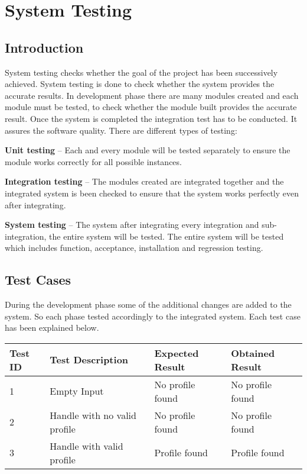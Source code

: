 \documentclass[12pt,a4paper]{report}
\begin{document}
\newpage
\chapter{System Testing}
\section{Introduction}
System testing checks whether the goal of the project has been successively achieved. System testing is done to check whether the system provides the accurate results. In development phase there are many modules created and each module must be tested, to check whether the module built provides the accurate result. Once the system is completed the integration test has to be conducted. It assures the software quality. There are different types of testing:

\textbf{Unit testing} – Each and every module will be tested separately to ensure the module works correctly for all possible instances.

\textbf{Integration testing} – The modules created are integrated together and the integrated system is been checked to ensure that the system works perfectly even after integrating.   

\textbf{System testing} – The system after integrating every integration and sub-integration, the entire system will be tested. The entire system will be tested which includes function, acceptance, installation and regression testing.

\newpage
\section{Test Cases}

During the development phase some of the additional changes are added to the system. So each phase tested accordingly to the integrated system. Each test case has been explained below.  

\begin{center}
\begin{tabularx}{\textwidth} { | X | X | X | X | } 
 \hline
Test ID & Test Description & Expected Result & Obtained Result \\ 
\hline
1 & Empty Input & No profile found & No profile found \\ 
\hline 
2 & Handle with no valid profile & No profile found & No profile found \\ 
\hline
3 & Handle with valid profile & Profile found & Profile found \\ 
\hline
\end{tabularx}
\end{center}
\end{document}
